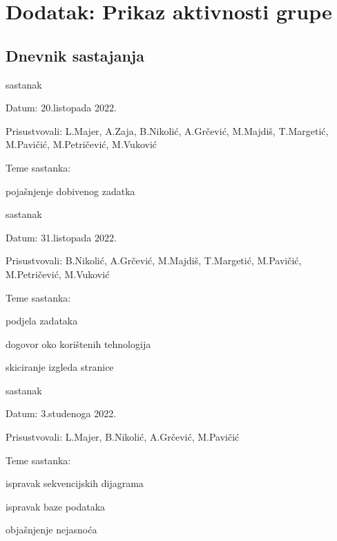 \chapter*{Dodatak: Prikaz aktivnosti grupe}
		
		\section*{Dnevnik sastajanja}
		
		\begin{packed_enum}
			\item  sastanak
			
			\item[] \begin{packed_item}
				\item Datum: 20.listopada 2022.
				\item Prisustvovali: L.Majer, A.Zaja, B.Nikolić, A.Grčević, M.Majdiš, T.Margetić, M.Pavičić, M.Petričević, M.Vuković
				\item Teme sastanka:
				\begin{packed_item}
					\item  pojašnjenje dobivenog zadatka
				\end{packed_item}
			\end{packed_item}
			
		
			\item sastanak
			
				\item[] \begin{packed_item}
				\item Datum: 31.listopada 2022.
				\item Prisustvovali: B.Nikolić, A.Grčević, M.Majdiš, T.Margetić, M.Pavičić, M.Petričević, M.Vuković
				\item Teme sastanka:
				\begin{packed_item}
					\item  podjela zadataka
					\item dogovor oko korištenih tehnologija
					\item skiciranje izgleda stranice
				\end{packed_item}
			\end{packed_item}
		
		
			\item sastanak
				
				\item[] \begin{packed_item}
					\item Datum: 3.studenoga 2022.
					\item Prisustvovali: L.Majer, B.Nikolić, A.Grčević, M.Pavičić
					\item Teme sastanka:
					\begin{packed_item}
						\item ispravak sekvencijskih dijagrama
						\item ispravak baze podataka
						\item objašnjenje nejasnoća
					\end{packed_item}
				\end{packed_item}
			

\end{packed_enum}
